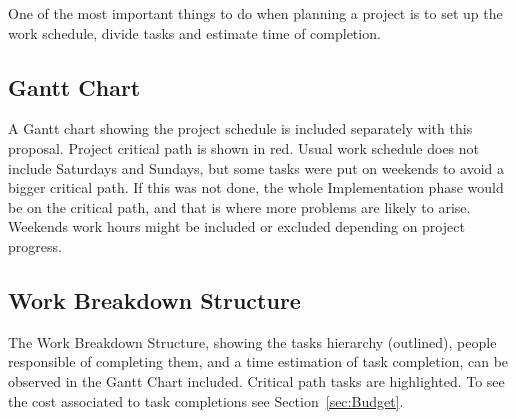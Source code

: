 
One of the most important things to do when
planning a project is to set up the work schedule, divide tasks and estimate
time of completion.

\subsection{Gantt Chart}

A Gantt chart showing the project schedule is included
separately with this proposal. Project critical path is shown in red. Usual work schedule
does not include Saturdays and Sundays, but some tasks were put on weekends to avoid a
bigger critical path. If this was not done, the whole Implementation phase would be on the
critical path, and that is where more problems are likely to arise.
Weekends work hours might be included or excluded depending on project
progress. 

\subsection{Work Breakdown Structure}

The Work Breakdown Structure, showing the
tasks hierarchy (outlined), people responsible  of completing them, and a time
estimation of task completion, can be observed in the
Gantt Chart included. Critical path tasks are highlighted. To see the cost 
associated to task completions see Section~\ref{sec:Budget}.